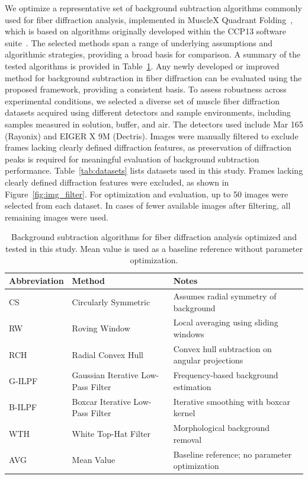 \documentclass[iucr]{iucrjournals}
\begin{document}
We optimize a representative set of background subtraction algorithms commonly used for fiber diffraction analysis, implemented in MuscleX Quadrant Folding~\cite{JiratrakanvongEtAl2024}, which is based on algorithms originally developed within the CCP13 software suite~\cite{HeEtAl2007}. The selected methods span a range of underlying assumptions and algorithmic strategies, providing a broad basis for comparison. A summary of the tested algorithms is provided in Table~\ref{tab:algorithms}. Any newly developed or improved method for background subtraction in fiber diffraction can be evaluated using the proposed framework, providing a consistent basis. To assess robustness across experimental conditions, we selected a diverse set of muscle fiber diffraction datasets acquired using different detectors and sample environments, including samples measured in solution, buffer, and air. The detectors used include Mar 165 (Rayonix) and EIGER X 9M (Dectris). Images were manually filtered to exclude frames lacking clearly defined diffraction features, as preservation of diffraction peaks is required for meaningful evaluation of background subtraction performance. Table~\ref{tab:datasets} lists datasets used in this study. Frames lacking clearly defined diffraction features were excluded, as shown in Figure~\ref{fig:img_filter}. For optimization and evaluation, up to 50 images were selected from each dataset. In cases of fewer available images after filtering, all remaining images were used.

\begin{table}[t]
\caption{Background subtraction algorithms for fiber diffraction analysis optimized and tested in this study. Mean value is used as a baseline reference without parameter optimization.}
\label{tab:algorithms}
\centering
\small
\setlength{\tabcolsep}{6pt}
\renewcommand{\arraystretch}{1.1}
\begin{tabular}{@{}lll@{}}
\toprule
\textbf{Abbreviation} & \textbf{Method} & \textbf{Notes} \\
\midrule
CS & Circularly Symmetric & Assumes radial symmetry of background \\
RW & Roving Window & Local averaging using sliding windows \\
RCH & Radial Convex Hull & Convex hull subtraction on angular projections \\
G-ILPF & Gaussian Iterative Low-Pass Filter & Frequency-based background estimation \\
B-ILPF & Boxcar Iterative Low-Pass Filter & Iterative smoothing with boxcar kernel \\
WTH & White Top-Hat Filter & Morphological background removal \\
\midrule
AVG & Mean Value & Baseline reference; no parameter optimization \\
\bottomrule
\end{tabular}
\end{table}
\end{document}
